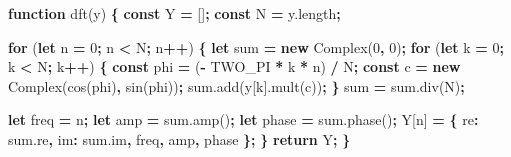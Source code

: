 \documentclass[
]{book}
\newenvironment{Shaded}{\begin{snugshade}}{\end{snugshade}}
\newcommand{\AttributeTok}[1]{\textcolor[rgb]{0.77,0.63,0.00}{#1}}
\newcommand{\ControlFlowTok}[1]{\textcolor[rgb]{0.13,0.29,0.53}{\textbf{#1}}}
\newcommand{\DataTypeTok}[1]{\textcolor[rgb]{0.13,0.29,0.53}{#1}}
\newcommand{\DecValTok}[1]{\textcolor[rgb]{0.00,0.00,0.81}{#1}}
\newcommand{\KeywordTok}[1]{\textcolor[rgb]{0.13,0.29,0.53}{\textbf{#1}}}
\newcommand{\NormalTok}[1]{#1}
\newcommand{\OperatorTok}[1]{\textcolor[rgb]{0.81,0.36,0.00}{\textbf{#1}}}
\newcommand{\VariableTok}[1]{\textcolor[rgb]{0.00,0.00,0.00}{#1}}
\begin{document}
\begin{Shaded}
\begin{Highlighting}[]
\KeywordTok{function} \AttributeTok{dft}\NormalTok{(y) }\OperatorTok{\{}
    \KeywordTok{const}\NormalTok{ Y }\OperatorTok{=}\NormalTok{ []}\OperatorTok{;}
    \KeywordTok{const}\NormalTok{ N }\OperatorTok{=} \VariableTok{y}\NormalTok{.}\AttributeTok{length}\OperatorTok{;}

    \ControlFlowTok{for}\NormalTok{ (}\KeywordTok{let}\NormalTok{ n }\OperatorTok{=} \DecValTok{0}\OperatorTok{;}\NormalTok{ n }\OperatorTok{<}\NormalTok{ N}\OperatorTok{;}\NormalTok{ n}\OperatorTok{++}\NormalTok{) }\OperatorTok{\{}
        \KeywordTok{let}\NormalTok{ sum }\OperatorTok{=} \KeywordTok{new} \AttributeTok{Complex}\NormalTok{(}\DecValTok{0}\OperatorTok{,} \DecValTok{0}\NormalTok{)}\OperatorTok{;}
        \ControlFlowTok{for}\NormalTok{ (}\KeywordTok{let}\NormalTok{ k }\OperatorTok{=} \DecValTok{0}\OperatorTok{;}\NormalTok{ k }\OperatorTok{<}\NormalTok{ N}\OperatorTok{;}\NormalTok{ k}\OperatorTok{++}\NormalTok{) }\OperatorTok{\{}
            \KeywordTok{const}\NormalTok{ phi }\OperatorTok{=}\NormalTok{ (}\OperatorTok{-}\NormalTok{ TWO_PI }\OperatorTok{*}\NormalTok{ k }\OperatorTok{*}\NormalTok{ n) }\OperatorTok{/}\NormalTok{ N}\OperatorTok{;}
            \KeywordTok{const}\NormalTok{ c }\OperatorTok{=} \KeywordTok{new} \AttributeTok{Complex}\NormalTok{(}\AttributeTok{cos}\NormalTok{(phi)}\OperatorTok{,} \AttributeTok{sin}\NormalTok{(phi))}\OperatorTok{;}
            \VariableTok{sum}\NormalTok{.}\AttributeTok{add}\NormalTok{(y[k].}\AttributeTok{mult}\NormalTok{(c))}\OperatorTok{;}
        \OperatorTok{\}}
\NormalTok{        sum }\OperatorTok{=} \VariableTok{sum}\NormalTok{.}\AttributeTok{div}\NormalTok{(N)}\OperatorTok{;}

        \KeywordTok{let}\NormalTok{ freq }\OperatorTok{=}\NormalTok{ n}\OperatorTok{;}
        \KeywordTok{let}\NormalTok{ amp }\OperatorTok{=} \VariableTok{sum}\NormalTok{.}\AttributeTok{amp}\NormalTok{()}\OperatorTok{;}
        \KeywordTok{let}\NormalTok{ phase }\OperatorTok{=} \VariableTok{sum}\NormalTok{.}\AttributeTok{phase}\NormalTok{()}\OperatorTok{;}
\NormalTok{        Y[n] }\OperatorTok{=} \OperatorTok{\{} \DataTypeTok{re}\OperatorTok{:} \VariableTok{sum}\NormalTok{.}\AttributeTok{re}\OperatorTok{,} \DataTypeTok{im}\OperatorTok{:} \VariableTok{sum}\NormalTok{.}\AttributeTok{im}\OperatorTok{,}\NormalTok{ freq}\OperatorTok{,}\NormalTok{ amp}\OperatorTok{,}\NormalTok{ phase }\OperatorTok{\};}
    \OperatorTok{\}}
    \ControlFlowTok{return}\NormalTok{ Y}\OperatorTok{;}
\OperatorTok{\}}
\end{Highlighting}
\end{Shaded}
\end{document}
